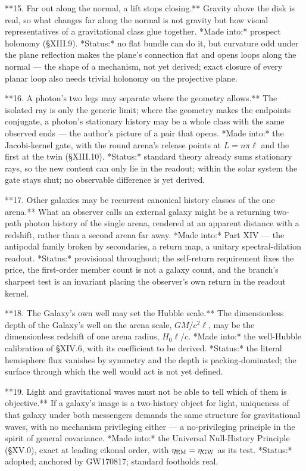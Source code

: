 **15. Far out along the normal, a lift stops closing.** Gravity above the disk is real, so what changes far along the normal is not gravity but how visual representatives of a gravitational class glue together. *Made into:* prospect holonomy (§XIII.9). *Status:* no flat bundle can do it, but curvature odd under the plane reflection makes the plane's connection flat and opens loops along the normal — the shape of a mechanism, not yet derived; exact closure of every planar loop also needs trivial holonomy on the projective plane.

**16. A photon's two legs may separate where the geometry allows.** The isolated ray is only the generic limit; where the geometry makes the endpoints conjugate, a photon's stationary history may be a whole class with the same observed ends — the author's picture of a pair that opens. *Made into:* the Jacobi-kernel gate, with the round arena's release points at $L = n\pi\ell$ and the first at the twin (§XIII.10). *Status:* standard theory already sums stationary rays, so the new content can only lie in the readout; within the solar system the gate stays shut; no observable difference is yet derived.

**17. Other galaxies may be recurrent canonical history classes of the one arena.** What an observer calls an external galaxy might be a returning two-path photon history of the single arena, rendered at an apparent distance with a redshift, rather than a second arena far away. *Made into:* Part XIV — the antipodal family broken by secondaries, a return map, a unitary spectral-dilation readout. *Status:* provisional throughout; the self-return requirement fixes the price, the first-order member count is not a galaxy count, and the branch's sharpest test is an invariant placing the observer's own return in the readout kernel.

**18. The Galaxy's own well may set the Hubble scale.** The dimensionless depth of the Galaxy's well on the arena scale, $GM/c^2\ell$, may be the dimensionless redshift of one arena radius, $H_0\ell/c$. *Made into:* the well-Hubble calibration of §XIV.6, with its coefficient to be derived. *Status:* the literal hemisphere flux vanishes by symmetry and the depth is packing-dominated; the surface through which the well would act is not yet defined.

**19. Light and gravitational waves must not be able to tell which of them is objective.** If a galaxy's image is a two-history object for light, uniqueness of that galaxy under both messengers demands the same structure for gravitational waves, with no mechanism privileging either — a no-privileging principle in the spirit of general covariance. *Made into:* the Universal Null-History Principle (§XV.0), exact at leading eikonal order, with $\eta_{\rm EM} = \eta_{\rm GW}$ as its test. *Status:* adopted; anchored by GW170817; standard footholds real.

